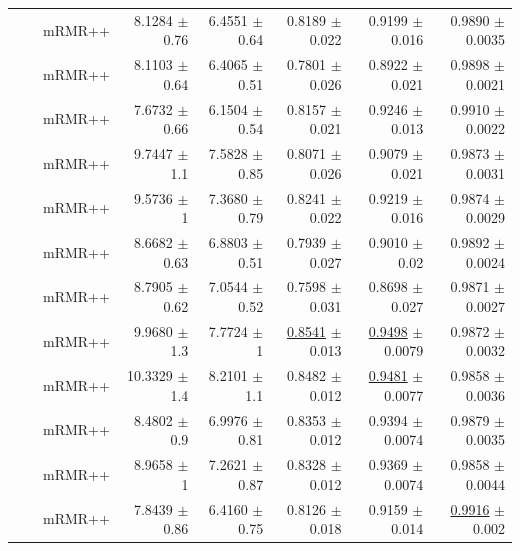 \begin{longtable}{llp{}rrrrr}
 &  & mRMR++ & 8.1284 {\scriptsize $\pm$ 0.76} & 6.4551 {\scriptsize $\pm$ 0.64} & 0.8189 {\scriptsize $\pm$ 0.022} & 0.9199 {\scriptsize $\pm$ 0.016} & 0.9890 {\scriptsize $\pm$ 0.0035} \\
 &  & mRMR++ & 8.1103 {\scriptsize $\pm$ 0.64} & 6.4065 {\scriptsize $\pm$ 0.51} & 0.7801 {\scriptsize $\pm$ 0.026} & 0.8922 {\scriptsize $\pm$ 0.021} & 0.9898 {\scriptsize $\pm$ 0.0021} \\
 &  & mRMR++ & 7.6732 {\scriptsize $\pm$ 0.66} & 6.1504 {\scriptsize $\pm$ 0.54} & 0.8157 {\scriptsize $\pm$ 0.021} & 0.9246 {\scriptsize $\pm$ 0.013} & 0.9910 {\scriptsize $\pm$ 0.0022} \\
 &  & mRMR++ & 9.7447 {\scriptsize $\pm$ 1.1} & 7.5828 {\scriptsize $\pm$ 0.85} & 0.8071 {\scriptsize $\pm$ 0.026} & 0.9079 {\scriptsize $\pm$ 0.021} & 0.9873 {\scriptsize $\pm$ 0.0031} \\
 &  & mRMR++ & 9.5736 {\scriptsize $\pm$ 1} & 7.3680 {\scriptsize $\pm$ 0.79} & 0.8241 {\scriptsize $\pm$ 0.022} & 0.9219 {\scriptsize $\pm$ 0.016} & 0.9874 {\scriptsize $\pm$ 0.0029} \\
 &  & mRMR++ & 8.6682 {\scriptsize $\pm$ 0.63} & 6.8803 {\scriptsize $\pm$ 0.51} & 0.7939 {\scriptsize $\pm$ 0.027} & 0.9010 {\scriptsize $\pm$ 0.02} & 0.9892 {\scriptsize $\pm$ 0.0024} \\
 &  & mRMR++ & 8.7905 {\scriptsize $\pm$ 0.62} & 7.0544 {\scriptsize $\pm$ 0.52} & 0.7598 {\scriptsize $\pm$ 0.031} & 0.8698 {\scriptsize $\pm$ 0.027} & 0.9871 {\scriptsize $\pm$ 0.0027} \\
 &  & mRMR++ & 9.9680 {\scriptsize $\pm$ 1.3} & 7.7724 {\scriptsize $\pm$ 1} & \underline{0.8541} {\scriptsize $\pm$ 0.013} & \underline{0.9498} {\scriptsize $\pm$ 0.0079} & 0.9872 {\scriptsize $\pm$ 0.0032} \\
 &  & mRMR++ & 10.3329 {\scriptsize $\pm$ 1.4} & 8.2101 {\scriptsize $\pm$ 1.1} & 0.8482 {\scriptsize $\pm$ 0.012} & \underline{0.9481} {\scriptsize $\pm$ 0.0077} & 0.9858 {\scriptsize $\pm$ 0.0036} \\
 &  & mRMR++ & 8.4802 {\scriptsize $\pm$ 0.9} & 6.9976 {\scriptsize $\pm$ 0.81} & 0.8353 {\scriptsize $\pm$ 0.012} & 0.9394 {\scriptsize $\pm$ 0.0074} & 0.9879 {\scriptsize $\pm$ 0.0035} \\
 &  & mRMR++ & 8.9658 {\scriptsize $\pm$ 1} & 7.2621 {\scriptsize $\pm$ 0.87} & 0.8328 {\scriptsize $\pm$ 0.012} & 0.9369 {\scriptsize $\pm$ 0.0074} & 0.9858 {\scriptsize $\pm$ 0.0044} \\
 &  & mRMR++ & 7.8439 {\scriptsize $\pm$ 0.86} & 6.4160 {\scriptsize $\pm$ 0.75} & 0.8126 {\scriptsize $\pm$ 0.018} & 0.9159 {\scriptsize $\pm$ 0.014} & \underline{0.9916} {\scriptsize $\pm$ 0.002} \\

\end{longtable}
